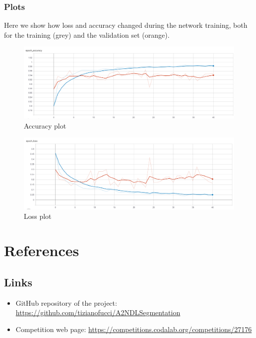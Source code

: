 \documentclass[12pt,a4paper]{report}
\begin{document}
\subsection{Plots}
Here we show how loss and accuracy changed during the network training, both for the training (grey) and the validation set (orange).
\begin{figure}[H]
	\includegraphics[scale = 0.5, center]{ResNet accuracy}
	\caption{Accuracy plot}
\end{figure}
\begin{figure}[H]
	\includegraphics[scale = 0.5, center]{ResNet loss}
	\caption{Loss plot}
\end{figure}
		
		
	
	\chapter{References}
		\section{Links}

\begin{itemize}
	\item GitHub repository of the project: \url{https://github.com/tizianofucci/A2NDLSegmentation}
	\item Competition web page: \url{https://competitions.codalab.org/competitions/27176}
\end{itemize}
\end{document}
